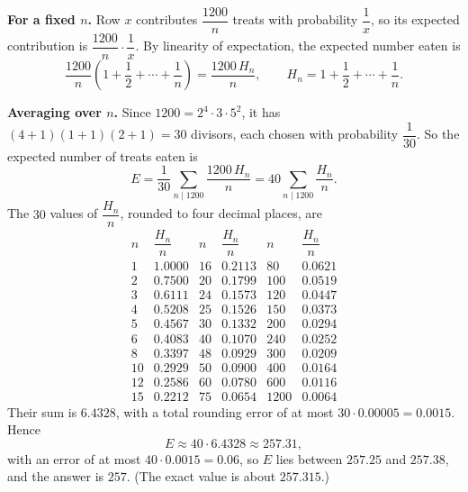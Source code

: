 \textbf{For a fixed $n$.} Row $x$ contributes $\dfrac{1200}{n}$ treats with probability $\dfrac1x$, so its expected contribution is $\dfrac{1200}{n}\cdot\dfrac1x$. By linearity of expectation, the expected number eaten is
\[\dfrac{1200}{n}\left(1+\dfrac12+\cdots+\dfrac1n\right)=\dfrac{1200\,H_n}{n},\qquad H_n=1+\dfrac12+\cdots+\dfrac1n.\]

\textbf{Averaging over $n$.} Since $1200=2^4\cdot3\cdot5^2$, it has $(4+1)(1+1)(2+1)=30$ divisors, each chosen with probability $\dfrac1{30}$. So the expected number of treats eaten is
\[E=\dfrac1{30}\sum_{n\mid1200}\dfrac{1200\,H_n}{n}=40\sum_{n\mid1200}\dfrac{H_n}{n}.\]
The $30$ values of $\dfrac{H_n}{n}$, rounded to four decimal places, are
\[\begin{array}{rl|rl|rl}
n & \dfrac{H_n}{n} & n & \dfrac{H_n}{n} & n & \dfrac{H_n}{n}\\ \hline
1 & 1.0000 & 16 & 0.2113 & 80 & 0.0621\\
2 & 0.7500 & 20 & 0.1799 & 100 & 0.0519\\
3 & 0.6111 & 24 & 0.1573 & 120 & 0.0447\\
4 & 0.5208 & 25 & 0.1526 & 150 & 0.0373\\
5 & 0.4567 & 30 & 0.1332 & 200 & 0.0294\\
6 & 0.4083 & 40 & 0.1070 & 240 & 0.0252\\
8 & 0.3397 & 48 & 0.0929 & 300 & 0.0209\\
10 & 0.2929 & 50 & 0.0900 & 400 & 0.0164\\
12 & 0.2586 & 60 & 0.0780 & 600 & 0.0116\\
15 & 0.2212 & 75 & 0.0654 & 1200 & 0.0064
\end{array}\]
Their sum is $6.4328$, with a total rounding error of at most $30\cdot0.00005=0.0015$. Hence
\[E\approx40\cdot6.4328\approx257.31,\]
with an error of at most $40\cdot0.0015=0.06$, so $E$ lies between $257.25$ and $257.38$, and the answer is $\boxed{257}$. (The exact value is about $257.315$.)
